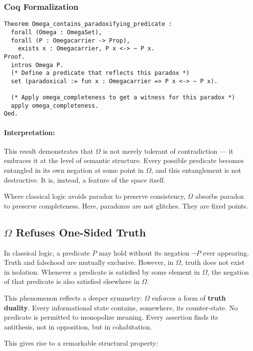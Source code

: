 \documentclass[12pt]{article}
\begin{document}
\subsubsection{Coq Formalization}
\begin{lstlisting}[language=Coq]
Theorem Omega_contains_paradoxifying_predicate :
  forall (Omega : OmegaSet),
  forall (P : Omegacarrier -> Prop),
    exists x : Omegacarrier, P x <-> ~ P x.
Proof.
  intros Omega P.
  (* Define a predicate that reflects this paradox *)
  set (paradoxical := fun x : Omegacarrier => P x <-> ~ P x).

  (* Apply omega_completeness to get a witness for this paradox *)
  apply omega_completeness.
Qed.
\end{lstlisting}

\paragraph{Interpretation:}
This result demonstrates that \( \Omega \) is not merely tolerant of contradiction — it embraces it at the level of semantic structure. Every possible predicate becomes entangled in its own negation at some point in \( \Omega \), and this entanglement is not destructive. It is, instead, a feature of the space itself.

Where classical logic avoids paradox to preserve consistency, \( \Omega \) absorbs paradox to preserve completeness. Here, paradoxes are not glitches. They are fixed points.


\subsection{\( \Omega \) Refuses One-Sided Truth}

In classical logic, a predicate \( P \) may hold without its negation \( \neg P \) ever appearing. Truth and falsehood are mutually exclusive. However, in \( \Omega \), truth does not exist in isolation. Whenever a predicate is satisfied by some element in \( \Omega \), the negation of that predicate is also satisfied elsewhere in \( \Omega \).

This phenomenon reflects a deeper symmetry: \( \Omega \) enforces a form of \textbf{truth duality}. Every informational state contains, somewhere, its counter-state. No predicate is permitted to monopolize meaning. Every assertion finds its antithesis, not in opposition, but in cohabitation.

This gives rise to a remarkable structural property:
\end{document}
